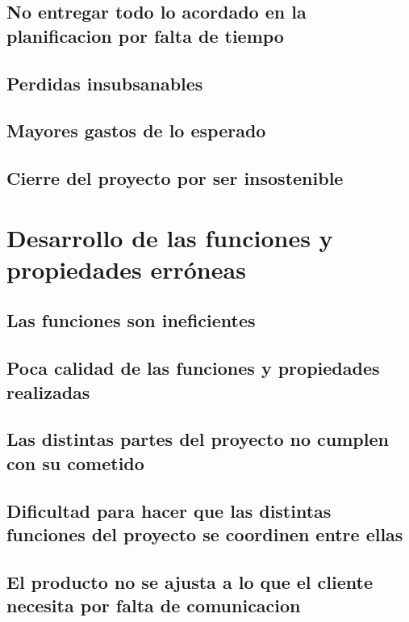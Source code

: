 \documentclass[spanish,a4paper,12pt]{report}	%
\begin{document}
	\subsection{No entregar todo lo acordado en la planificacion por falta de tiempo}

	\subsection{Perdidas insubsanables}

	\subsection{Mayores gastos de lo esperado}

	\subsection{Cierre del proyecto por ser insostenible}


\section{Desarrollo de las funciones y propiedades erróneas}

	\subsection{Las funciones son ineficientes}

	\subsection{Poca calidad de las funciones y propiedades realizadas}

	\subsection{Las distintas partes del proyecto no cumplen con su cometido}

	\subsection{Dificultad para hacer que las distintas funciones del proyecto se coordinen entre ellas}

	\subsection{El producto no se ajusta a lo que el cliente necesita por falta de comunicacion}
\end{document}
